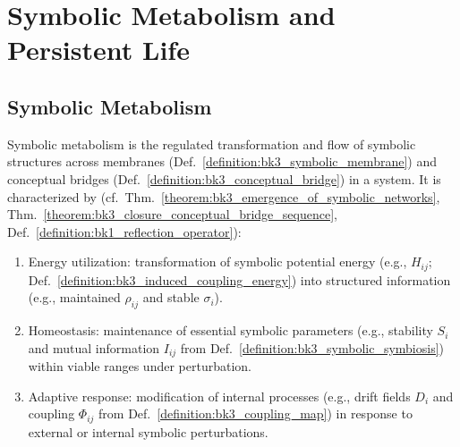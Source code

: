 \section{Symbolic Metabolism and Persistent Life} \label{sec:bk3_symbolic_metabolism_persistent_life}
\subsection{Symbolic Metabolism}

\begin{definition} \label{definition:bk3_symbolic_metabolism}
\leavevmode\newline
Symbolic metabolism is the regulated transformation and flow of symbolic
structures across membranes (Def.~\ref{definition:bk3_symbolic_membrane}) and
conceptual bridges (Def.~\ref{definition:bk3_conceptual_bridge}) in a system.
It is characterized by (cf.~Thm.~\ref{theorem:bk3_emergence_of_symbolic_networks},
Thm.~\ref{theorem:bk3_closure_conceptual_bridge_sequence},
Def.~\ref{definition:bk1_reflection_operator}):
\begin{enumerate}
    \item Energy utilization: transformation of symbolic potential energy
    (e.g., $H_{ij}$; Def.~\ref{definition:bk3_induced_coupling_energy}) into
    structured information (e.g., maintained $\rho_{ij}$ and stable $\sigma_i$).
    \item Homeostasis: maintenance of essential symbolic parameters
    (e.g., stability $S_i$ and mutual information $I_{ij}$ from
    Def.~\ref{definition:bk3_symbolic_symbiosis}) within viable ranges under
    perturbation.
    \item Adaptive response: modification of internal processes
    (e.g., drift fields $D_i$ and coupling $\Phi_{ij}$ from
    Def.~\ref{definition:bk3_coupling_map}) in response to external or internal
    symbolic perturbations.
\end{enumerate}
\end{definition}

